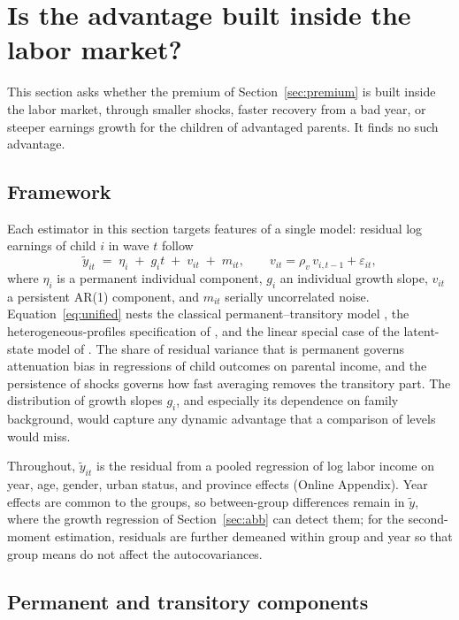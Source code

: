 \documentclass[11pt]{article}
\begin{document}
\section{Is the advantage built inside the labor market?}
\label{sec:process}

This section asks whether the premium of Section~\ref{sec:premium} is built inside the labor market, through smaller shocks, faster recovery from a bad year, or steeper earnings growth for the children of advantaged parents. It finds no such advantage.

\subsection{Framework}
\label{sec:framework}

Each estimator in this section targets features of a single model: residual log earnings of child $i$ in wave $t$ follow
\begin{equation}
\tilde y_{it} \;=\; \eta_i \;+\; g_i t \;+\; v_{it} \;+\; m_{it},
\qquad v_{it} = \rho_v\,v_{i,t-1} + \varepsilon_{it},
\label{eq:unified}
\end{equation}
where $\eta_i$ is a permanent individual component, $g_i$ an
individual growth slope, $v_{it}$ a persistent AR(1) component, and
$m_{it}$ serially uncorrelated noise. Equation~\eqref{eq:unified} nests
the classical permanent--transitory model \citep{HallMishkin1982,
MaCurdy1982}, the heterogeneous-profiles specification of
\citet{Guvenen2009}, and the linear special case of the latent-state
model of \citet{ArellanoBlundellBonhomme2017}. The share of residual variance that is permanent governs attenuation bias in regressions of child outcomes on parental income, and the persistence of shocks governs how fast averaging removes the transitory part. The
distribution of growth slopes $g_i$, and especially its dependence
on family background, would capture any dynamic advantage that a comparison of levels would miss.

Throughout, $\tilde y_{it}$ is the residual from a pooled regression of log labor income on year, age, gender, urban status, and province effects (Online Appendix). Year effects are common to the groups, so between-group differences remain in $\tilde y$, where the growth regression of Section~\ref{sec:abb} can detect them; for the second-moment estimation, residuals are further demeaned within group and year so that group means do not affect the autocovariances.

\subsection{Permanent and transitory components}
\label{sec:md}
\end{document}
